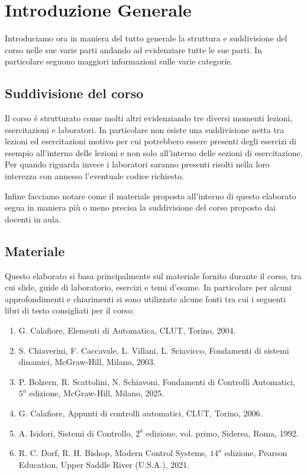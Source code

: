 \documentclass[../main.tex]{subfiles}
\begin{document}
\clearpage
\thispagestyle{empty}

\vspace*{7cm}
\section{Introduzione Generale}
\vspace*{1.5cm}


Introduciamo ora in maniera del tutto generale la struttura e suddivisione del corso nelle sue varie parti andando ad evidenziare tutte le sue parti. In particolare seguono maggiori informazioni sulle varie categorie.

\subsection{Suddivisione del corso}

Il corso é strutturato come molti altri evidenziando tre diversi momenti lezioni, esercitazioni e laboratori. In particolare non esiste una suddivisione netta tra lezioni ed esercitazioni motivo per cui potrebbero essere presenti degli esercizi di esempio all'interno delle lezioni e non solo all'interno delle sezioni di esercitazione. Per quando riguarda invece i laboratori saranno presenti risolti nella loro interezza con annesso l'eventuale codice richiesto.

Infine facciamo notare come il materiale proposto all'interno di questo elaborato segua in maniera più o meno precisa la suddivisione del corso proposto dai docenti in aula.

\subsection{Materiale}

Questo elaborato si basa principalmente sul materiale fornito durante il corso, tra cui slide, guide di laboratorio, esercizi e temi d’esame. In particolare per alcuni approfondimenti e chiarimenti si sono utilizzate alcune fonti tra cui i seguenti libri di testo consigliati per il corso:

\begin{enumerate}
	\item[\textbf{-}] G. Calafiore, Elementi di Automatica, CLUT, Torino, 2004.
	\item[\textbf{-}] S. Chiaverini, F. Caccavale, L. Villani, L. Sciavicco, Fondamenti di sistemi dinamici, McGraw-Hill, Milano, 2003.
	\item[\textbf{-}] P. Bolzern, R. Scattolini, N. Schiavoni, Fondamenti di Controlli Automatici, $5^a$ edizione, McGraw-Hill, Milano, 2025.
	\item[\textbf{-}] G. Calafiore, Appunti di controlli automatici, CLUT, Torino, 2006.
	\item[\textbf{-}] A. Isidori, Sistemi di Controllo, $2^a$ edizione, vol. primo, Siderea, Roma, 1992.
	\item[\textbf{-}] R. C. Dorf, R. H. Bishop, Modern Control Systems, $14^a$ edizione, Pearson Education, Upper Saddle River (U.S.A.), 2021.
\end{enumerate}
\end{document}
